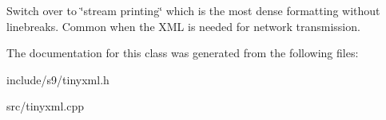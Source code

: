 Switch over to \char`\"{}stream printing\char`\"{} which is the most dense formatting without linebreaks. Common when the X\-M\-L is needed for network transmission. 

The documentation for this class was generated from the following files\-:\begin{DoxyCompactItemize}
\item 
include/s9/tinyxml.\-h\item 
src/tinyxml.\-cpp\end{DoxyCompactItemize}
